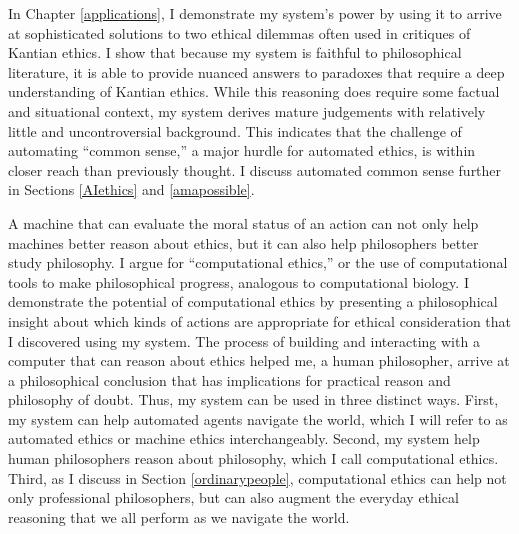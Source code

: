 \begin{isabellebody}
\begin{isamarkuptext}
In Chapter \ref{applications}, I demonstrate my system's power by using it to arrive at sophisticated
solutions to two ethical dilemmas often used in critiques of Kantian ethics. I show that because my system is 
faithful to philosophical literature, it is able to provide nuanced answers to paradoxes that require a
deep understanding of Kantian ethics. While this reasoning does require some factual and situational
context, my system derives mature judgements with relatively little and uncontroversial background.
This indicates that the challenge of automating ``common sense,'' a major hurdle for automated ethics, 
is within closer reach than previously thought. I discuss automated common sense further in
Sections \ref{AIethics} and \ref{amapossible}.

A machine that can evaluate the moral status of an action can not only help machines better reason about ethics, 
but it can also help philosophers better study philosophy. I argue for ``computational ethics,'' or the use of computational tools to 
make philosophical progress, analogous to computational biology. 
I demonstrate the potential of computational ethics by presenting a 
philosophical insight about which kinds of actions are appropriate for ethical consideration that I 
discovered using my system. The process of building and interacting with a computer that can reason 
about ethics helped me, a human philosopher, arrive at a philosophical conclusion that has implications for practical
reason and philosophy of doubt. Thus, my system can be used in three distinct ways. First, my system can help
automated agents navigate the world, which I will refer to as automated ethics or machine ethics interchangeably. Second, 
my system help human philosophers reason about philosophy, which I call computational ethics. Third, as 
I discuss in Section \ref{ordinarypeople}, computational ethics can help not only professional philosophers,
but can also augment the everyday ethical reasoning that we all perform as we navigate the world.%
\end{isamarkuptext}\isamarkuptrue%
%
\isadelimtheory
%
\endisadelimtheory
%
\isatagtheory
%
\endisatagtheory
{\isafoldtheory}%
%
\isadelimtheory
%
\endisadelimtheory
%
\end{isabellebody}%
\endinput
